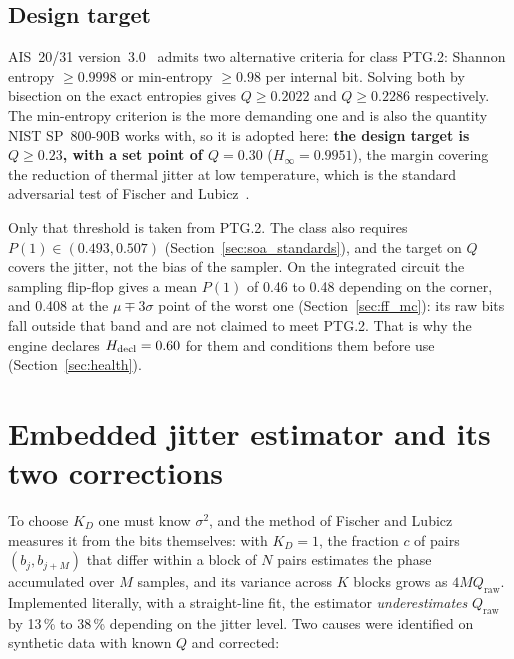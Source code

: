 \subsection{Design target}

AIS~20/31 version~3.0~\cite{peter_2024_ais31} admits two alternative
criteria for class PTG.2: Shannon entropy $\ge 0.9998$ or min-entropy
$\ge 0.98$ per internal bit. Solving both by bisection on the exact
entropies gives $Q \ge 0.2022$ and $Q \ge 0.2286$ respectively. The
min-entropy criterion is the more demanding one and is also the quantity
NIST SP~800-90B works with, so it is adopted here: \textbf{the design
target is $Q \ge 0.23$, with a set point of $Q = 0.30$} ($H_\infty =
0.9951$), the margin covering the reduction of thermal jitter at low
temperature, which is the standard adversarial test of Fischer and
Lubicz~\cite{fischer_2014_embedded}.

Only that threshold is taken from PTG.2. The class also requires
$P(1)\in(0.493, 0.507)$ (Section~\ref{sec:soa_standards}), and the target
on $Q$ covers the jitter, not the bias of the sampler. On the integrated
circuit the sampling flip-flop gives a mean $P(1)$ of 0.46 to 0.48
depending on the corner, and 0.408 at the $\mu \mp 3\sigma$ point of the
worst one \simu{} (Section~\ref{sec:ff_mc}): its raw bits fall outside
that band and are not claimed to meet PTG.2. That is why the engine
declares $H_{\mathrm{decl}} = 0.60$ for them and conditions them before use
(Section~\ref{sec:health}).

\section{Embedded jitter estimator and its two corrections}
\label{sec:estimator}

To choose $K_D$ one must know $\sigma^2$, and the method of Fischer and
Lubicz~\cite{fischer_2014_embedded} measures it from the bits themselves:
with $K_D = 1$, the fraction $c$ of pairs $(b_j, b_{j+M})$ that differ
within a block of $N$ pairs estimates the phase accumulated over $M$
samples, and its variance across $K$ blocks grows as $4 M Q_{\mathrm{raw}}$.
Implemented literally, with a straight-line fit, the estimator
\emph{underestimates} $Q_{\mathrm{raw}}$ by 13\,\% to 38\,\% depending on
the jitter level. Two causes were identified on synthetic data with known
$Q$ and corrected:

